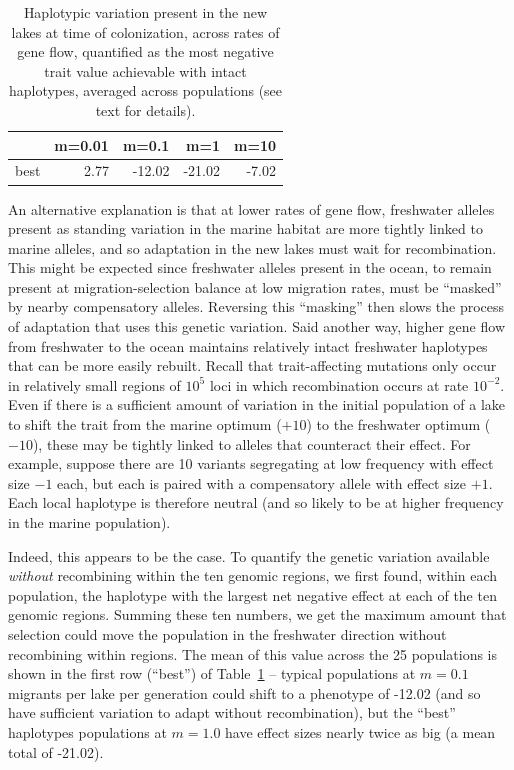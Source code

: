 \documentclass{article}
\begin{document}
\begin{table}[ht]
    \centering
    \begin{tabular}{rrrrr}
      \hline
     & m=0.01 & m=0.1 & m=1 & m=10 \\ 
      \hline
          best & 2.77 & -12.02 & -21.02 & -7.02 \\ 
       \hline
    \end{tabular}
    \caption{
        Haplotypic variation present in the new lakes at time of colonization,
        across rates of gene flow,
        quantified as the most negative trait value achievable
            with intact haplotypes, averaged across populations
            (see text for details).
    } \label{tab:linkage}
\end{table}

An alternative explanation is that at lower rates of gene flow,
freshwater alleles present as standing variation in the marine habitat
are more tightly linked to marine alleles,
and so adaptation in the new lakes must wait for recombination.
This might be expected since freshwater alleles present in the ocean,
to remain present at migration-selection balance at low migration rates,
must be ``masked'' by nearby compensatory alleles.
Reversing this ``masking'' then slows the process of adaptation that uses this genetic variation.
Said another way,
higher gene flow from freshwater to the ocean
maintains relatively intact freshwater haplotypes
that can be more easily rebuilt.
Recall that trait-affecting mutations only occur in relatively small regions of $10^5$ loci
in which recombination occurs at rate $10^{-2}$.
Even if there is a sufficient amount of variation in the initial population of a lake
to shift the trait from the marine optimum ($+10$) to the freshwater optimum ($-10$),
these may be tightly linked to alleles that counteract their effect.
For example, suppose there are 10 variants segregating at low frequency with effect size $-1$ each,
but each is paired with a compensatory allele with effect size $+1$.
Each local haplotype is therefore neutral
(and so likely to be at higher frequency in the marine population).

Indeed, this appears to be the case.
To quantify the genetic variation available \emph{without} recombining within the ten genomic regions,
we first found, within each population, the haplotype with the largest net negative effect
at each of the ten genomic regions.
Summing these ten numbers, 
we get the maximum amount that selection could move the population in the freshwater direction
without recombining within regions.
The mean of this value across the 25 populations is shown 
in the first row (``best'') of Table~\ref{tab:linkage} --
typical populations at $m=0.1$ migrants per lake per generation could shift to a phenotype of -12.02
(and so have sufficient variation to adapt without recombination),
but the ``best'' haplotypes populations at $m=1.0$ have effect sizes nearly twice as big 
(a mean total of -21.02).
\end{document}
